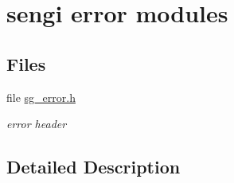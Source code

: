 \hypertarget{group___s_g___e_r_r_o_r}{}\section{sengi error modules}
\label{group___s_g___e_r_r_o_r}
\subsection*{Files}
\begin{DoxyCompactItemize}
\item 
file \hyperlink{sg__error_8h}{sg\+\_\+error.\+h}
\begin{DoxyCompactList}\small\item\em error header \end{DoxyCompactList}\end{DoxyCompactItemize}


\subsection{Detailed Description}
